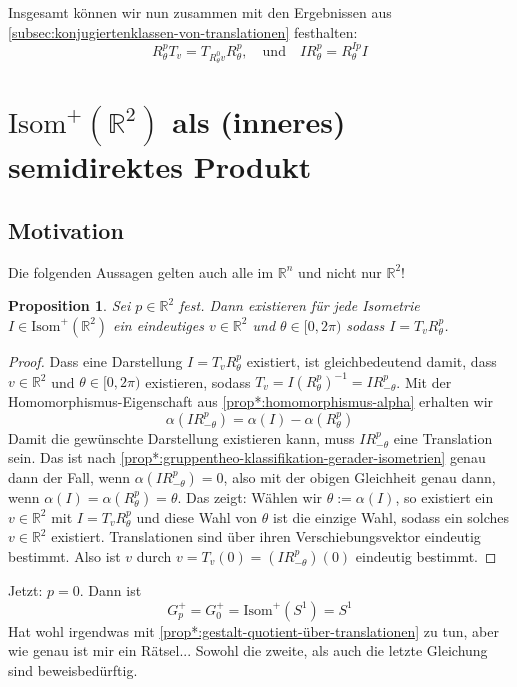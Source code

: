 \documentclass[a4paper, ngerman]{article}
\newcounter{chapter}
\numberwithin{equation}{chapter}
\theoremstyle{plain}
\newtheorem{proposition}{Proposition}[chapter]
\theoremstyle{definition}
\newcommand{\geradisometr}{\ensuremath{\mathrm{Isom}^+(\mathbb R^2)}}
\newcommand{\anm}[1]{{\color{red} #1}}
\begin{document}
Insgesamt können wir nun zusammen mit den Ergebnissen aus \cref{subsec:konjugiertenklassen-von-translationen} festhalten:
\begin{equation}\label{eq:konjugations-relationen}
    R_\theta^p T_v = T_{R_\theta^0 v} R_\theta^p, \quad \text{und} \quad IR_\theta^p = R_\theta^{Ip}I
\end{equation}

\section{\(\geradisometr\) als (inneres) semidirektes Produkt}

\subsection{Motivation}
Die folgenden Aussagen gelten auch alle im \(\mathbb R^n\) und nicht nur \(\mathbb R^2\)!
\begin{proposition}\label{prop:zerlegung-gerader-isometrien}
    Sei \(p \in \mathbb R^2\) fest. Dann existieren für jede Isometrie \(I \in \geradisometr\) ein eindeutiges \(v \in \mathbb R^2\) und \(\theta \in [0,2\pi)\) sodass \(I = T_v R_\theta^p\).  
\end{proposition}
\begin{proof}
    Dass eine Darstellung \(I = T_v R_\theta^p\) existiert, ist gleichbedeutend damit, dass \(v \in \mathbb R^2\) und \(\theta\in [0,2\pi)\) existieren, sodass \(T_v = I(R_\theta^p)^{-1} = I R_{-\theta}^p\). Mit der Homomorphismus-Eigenschaft aus \cref{prop*:homomorphismus-alpha} erhalten wir 
    \begin{equation*}
        \alpha(IR_{-\theta}^p) = \alpha(I) - \alpha(R_\theta^p)
    \end{equation*}
    Damit die gewünschte Darstellung existieren kann, muss \(IR_{-\theta}^p\) eine Translation sein. Das ist nach \cref{prop*:gruppentheo-klassifikation-gerader-isometrien} genau dann der Fall, wenn \(\alpha(IR_{-\theta}^p) = 0\), also mit der obigen Gleichheit genau dann, wenn \(\alpha(I) = \alpha(R_\theta^p) = \theta\). Das zeigt: Wählen wir \(\theta := \alpha(I)\), so existiert ein \(v \in \mathbb R^2\) mit \(I = T_v R_\theta^p\) und diese Wahl von \(\theta\) ist die einzige Wahl, sodass ein solches \(v \in \mathbb R^2\) existiert. Translationen sind über ihren Verschiebungsvektor eindeutig bestimmt. Also ist \(v\) durch \(v = T_v(0) = (IR_{-\theta}^p) (0)\) eindeutig bestimmt. 
\end{proof}
Jetzt: \(p=0\). Dann ist 
\begin{equation*}
    G_p^+ = G_0^+ = \mathrm{Isom}^+(S^1) = S^1
\end{equation*}
\anm{Hat wohl irgendwas mit \cref{prop*:gestalt-quotient-über-translationen} zu tun, aber wie genau ist mir ein Rätsel... Sowohl die zweite, als auch die letzte Gleichung sind beweisbedürftig.}
\end{document}
